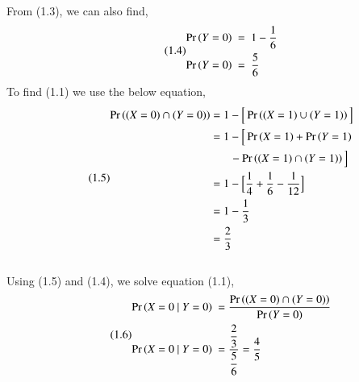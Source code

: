 \documentclass[journal,12pt,twocolumn]{IEEEtran}
\begin{document}
From (1.3), we can also find,
\begin{align}\tag{1.4}
    \begin{split}
        \Pr\left(Y=0\right)\ &=\ 1 - \dfrac{1}{6}\\
        \Pr\left(Y=0\right)\ &=\ \dfrac{5}{6}\\
    \end{split}
\end{align}
To find (1.1) we use the below equation,
\begin{align}\tag{1.5}
    \begin{split}
        \Pr\left((X=0) \cap (Y=0)\right) &= 1 - \Big[\Pr\left((X=1) \cup (Y=1)\right)\Big]\\
        &= 1 - \Big[\Pr\left(X=1\right) + \Pr\left(Y=1\right)\\
        & \ \ \ \ \ \ \ - \Pr\left((X=1) \cap (Y=1)\right)\Big]\\
        &= 1 - \Big[\dfrac{1}{4} + \dfrac{1}{6} - \dfrac{1}{12}\Big]\\
        &= 1 - \dfrac{1}{3}\\
        &= \dfrac{2}{3}
    \end{split}
\end{align}
\\Using (1.5) and (1.4), we solve equation (1.1),
\begin{align*}\tag{1.6}
    \begin{split}
        \Pr\left(X=0\ |\ Y=0\right)\ &= \dfrac{\Pr\left((X=0) \cap (Y=0)\right)}{\Pr\left(Y=0\right)}\\
        \Pr\left(X=0\ |\ Y=0\right)\ &= \dfrac{\dfrac{2}{3}}{\dfrac{5}{6}} = \dfrac{4}{5}\\
    \end{split}
\end{align*}
\end{document}
